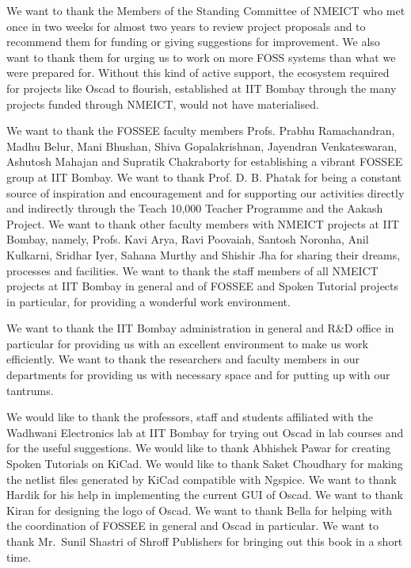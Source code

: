 We want to thank the Members of the Standing Committee of NMEICT who
met once in two weeks for almost two years to review project proposals
and to recommend them for funding or giving suggestions for
improvement.  We also want to thank them for urging us to work on more
FOSS systems than what we were prepared for.  Without this kind of
active support, the ecosystem required for projects like Oscad to
flourish, established at IIT Bombay through the many projects funded
through NMEICT, would not have materialised.

We want to thank the FOSSEE faculty members Profs. Prabhu
Ramachandran, Madhu Belur, Mani Bhushan, Shiva Gopalakrishnan,
Jayendran Venkateswaran, Ashutosh Mahajan and Supratik Chakraborty for
establishing a vibrant FOSSEE group at IIT Bombay.  We want to thank
Prof. D. B. Phatak for being a constant source of inspiration and
encouragement and for supporting our activities directly and
indirectly through the Teach 10,000 Teacher Programme \cite{T10KT} and
the Aakash \cite{aakash} Project.  We want to thank other faculty
members with NMEICT projects at IIT Bombay, namely, Profs. Kavi Arya,
Ravi Poovaiah, Santosh Noronha, Anil Kulkarni, Sridhar Iyer, Sahana
Murthy and Shishir Jha for sharing their dreams, processes and
facilities.  We want to thank the staff members of all NMEICT projects
at IIT Bombay in general and of FOSSEE and Spoken Tutorial projects in
particular, for providing a wonderful work environment.

We want to thank the IIT Bombay administration in general and R\&D
office in particular for providing us with an excellent environment to
make us work efficiently.  We want to thank the researchers and
faculty members in our departments for providing us with necessary
space and for putting up with our tantrums.

We would like to thank the professors, staff and students affiliated
with the Wadhwani Electronics lab at IIT Bombay for trying out Oscad
in lab courses and for the useful suggestions.  We would like to thank
Abhishek Pawar  for creating Spoken Tutorials on KiCad.  We would like
to thank Saket Choudhary for making the netlist files generated by
KiCad compatible with Ngspice.  We want to thank Hardik for his help
in implementing the current GUI of Oscad.  We want to thank Kiran for
designing the logo of Oscad.  We want to thank Bella for helping with
the coordination of FOSSEE in general and Oscad in particular.  We
want to thank Mr.~Sunil Shastri of Shroff Publishers for
bringing out this book in a short time.

